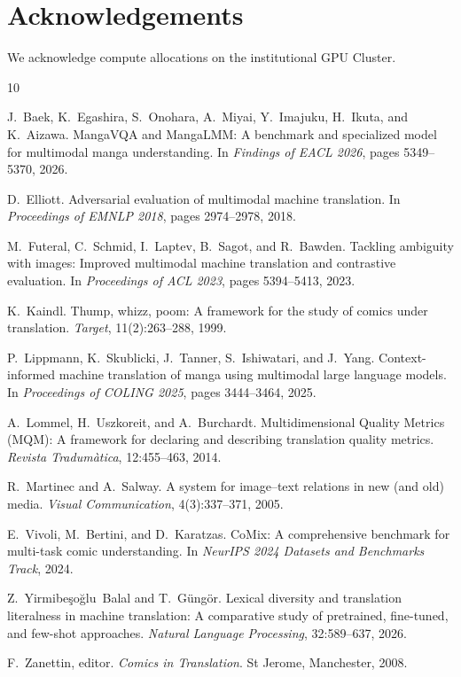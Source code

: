 \documentclass[11pt,a4paper]{article}
\begin{document}
\section*{Acknowledgements}
We acknowledge compute allocations on the institutional GPU Cluster.


\begin{thebibliography}{10}

J.~Baek, K.~Egashira, S.~Onohara, A.~Miyai, Y.~Imajuku, H.~Ikuta, and K.~Aizawa.
\newblock MangaVQA and MangaLMM: A benchmark and specialized model for multimodal manga understanding.
\newblock In \emph{Findings of EACL 2026}, pages 5349--5370, 2026.

D.~Elliott.
\newblock Adversarial evaluation of multimodal machine translation.
\newblock In \emph{Proceedings of EMNLP 2018}, pages 2974--2978, 2018.

M.~Futeral, C.~Schmid, I.~Laptev, B.~Sagot, and R.~Bawden.
\newblock Tackling ambiguity with images: Improved multimodal machine translation and contrastive evaluation.
\newblock In \emph{Proceedings of ACL 2023}, pages 5394--5413, 2023.

K.~Kaindl.
\newblock Thump, whizz, poom: A framework for the study of comics under translation.
\newblock \emph{Target}, 11(2):263--288, 1999.

P.~Lippmann, K.~Skublicki, J.~Tanner, S.~Ishiwatari, and J.~Yang.
\newblock Context-informed machine translation of manga using multimodal large language models.
\newblock In \emph{Proceedings of COLING 2025}, pages 3444--3464, 2025.

A.~Lommel, H.~Uszkoreit, and A.~Burchardt.
\newblock Multidimensional Quality Metrics (MQM): A framework for declaring and describing translation quality metrics.
\newblock \emph{Revista Tradum\`atica}, 12:455--463, 2014.

R.~Martinec and A.~Salway.
\newblock A system for image--text relations in new (and old) media.
\newblock \emph{Visual Communication}, 4(3):337--371, 2005.

E.~Vivoli, M.~Bertini, and D.~Karatzas.
\newblock CoMix: A comprehensive benchmark for multi-task comic understanding.
\newblock In \emph{NeurIPS 2024 Datasets and Benchmarks Track}, 2024.

Z.~Yirmibe\c{s}o\u{g}lu~Balal and T.~G\"ung\"or.
\newblock Lexical diversity and translation literalness in machine translation: A comparative study of pretrained, fine-tuned, and few-shot approaches.
\newblock \emph{Natural Language Processing}, 32:589--637, 2026.

F.~Zanettin, editor.
\newblock \emph{Comics in Translation}.
\newblock St Jerome, Manchester, 2008.

\end{thebibliography}
\end{document}
